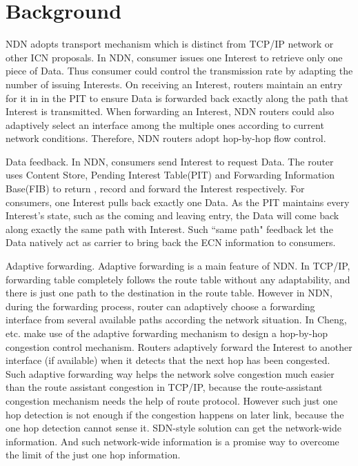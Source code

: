 
\section{Background}



NDN adopts transport mechanism \cite{NDN, Adaptive} which is distinct from TCP/IP network or other ICN proposals. In NDN, consumer issues one Interest to retrieve only one piece of Data. Thus consumer could control the transmission rate by adapting the number of issuing Interests. On receiving an Interest, routers maintain an entry for it in in the PIT to ensure Data is forwarded back exactly along the path that Interest is transmitted. When forwarding an Interest, NDN routers could also adaptively select an interface among the multiple ones according to current network conditions. Therefore, NDN routers adopt hop-by-hop flow control.


Data feedback. In NDN, consumers send Interest to request Data. The router uses Content Store, Pending Interest Table(PIT) and Forwarding Information Base(FIB) to return , record and forward the Interest respectively. For consumers, one Interest pulls back exactly one Data. As the PIT maintains every Interest's state, such as the coming and leaving entry, the Data will come back along exactly the same path with Interest. Such ``same path" feedback let the Data natively act as carrier to bring back the ECN information to consumers.

Adaptive forwarding. Adaptive forwarding is a main feature of NDN. In TCP/IP, forwarding table completely follows the route table without any adaptability, and there is just one path to the destination in the route table. However in NDN, during the forwarding process, router can adaptively choose a forwarding interface from several available paths according the network situation. In \cite{Adaptive} Cheng, etc. make use of the adaptive forwarding mechanism to design a hop-by-hop congestion control mechanism. Routers adaptively forward the Interest to another interface (if available) when it detects that the next hop has been congested. Such adaptive forwarding way helps the network solve congestion much easier than the route assistant congestion in TCP/IP, because the route-assistant congestion mechanism needs the help of route protocol\cite{selfish}. However such just one hop detection is not enough if the congestion happens on later link, because the one hop detection cannot sense it.  SDN-style solution can get the network-wide information\cite{SDN}. And such network-wide information is a promise way to overcome the limit of the just one hop information.

